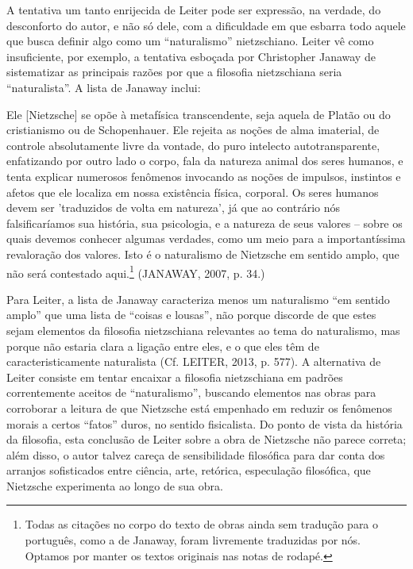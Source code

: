 \documentclass[
	12pt,				%
	openright,			%
	oneside,			%
	a4paper,			%
	english,			%
	french,				%
	spanish,			%
	brazil				%
	]{abntex2}
\begin{document}
	A tentativa um tanto enrijecida de Leiter pode ser expressão, na verdade, do desconforto do autor, e não só dele, com a dificuldade em que esbarra todo aquele que busca definir algo como um “naturalismo” nietzschiano. Leiter vê como insuficiente, por exemplo, a tentativa esboçada por Christopher Janaway de sistematizar as principais razões por que a filosofia nietzschiana seria “naturalista”. A lista de Janaway inclui: 

\begin{citacao}
Ele [Nietzsche] se opõe à metafísica transcendente, seja aquela de Platão ou do cristianismo ou de Schopenhauer. Ele rejeita as noções de alma imaterial, de controle absolutamente livre da vontade, do puro intelecto autotransparente, enfatizando por outro lado o corpo, fala da natureza animal dos seres humanos, e tenta explicar numerosos fenômenos invocando as noções de impulsos, instintos e afetos que ele localiza em nossa existência física, corporal. Os seres humanos devem ser 'traduzidos de volta em natureza', já que ao contrário nós falsificaríamos sua história, sua psicologia, e a natureza de seus valores – sobre os quais devemos conhecer algumas verdades, como um meio para a importantíssima revaloração dos valores. Isto é o naturalismo de Nietzsche em sentido amplo, que não será contestado aqui.\footnote{Todas as citações no corpo do texto de obras ainda sem tradução para o português, como a de Janaway, foram livremente traduzidas por nós. Optamos por manter os textos originais nas notas de rodapé.} (JANAWAY, 2007, p. 34.)
\end{citacao}

	Para Leiter, a lista de Janaway caracteriza menos um naturalismo “em sentido amplo” que uma lista de “coisas e lousas”, não porque discorde de que estes sejam elementos da filosofia nietzschiana relevantes ao tema do naturalismo, mas porque não estaria clara a ligação entre eles, e o que eles têm de caracteristicamente naturalista (Cf. LEITER, 2013, p. 577). A alternativa de Leiter consiste em tentar encaixar a filosofia nietzschiana em padrões correntemente aceitos de “naturalismo”, buscando elementos nas obras para corroborar a leitura de que Nietzsche está empenhado em reduzir os fenômenos morais a certos “fatos” duros, no sentido fisicalista. Do ponto de vista da história da filosofia, esta conclusão de Leiter sobre a obra de Nietzsche não parece correta; além disso, o autor talvez careça de sensibilidade filosófica para dar conta dos arranjos sofisticados entre ciência, arte, retórica, especulação filosófica, que Nietzsche experimenta ao longo de sua obra.
\end{document}
